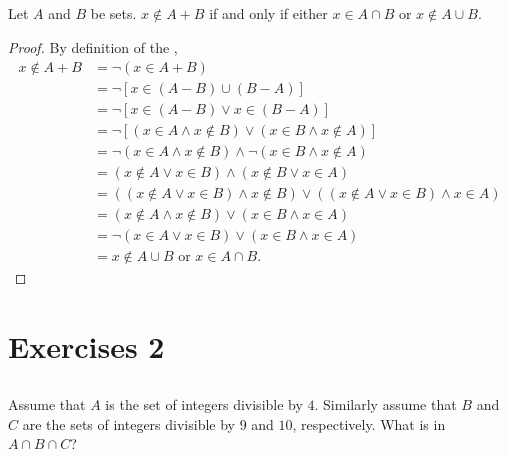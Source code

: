 \documentclass{report}
\begin{document}
\subsection{}
\label{sub:nonmembership-symmetric-difference}

Let $A$ and $B$ be sets. $x \not\in A + B$ if and only if either
  $x \in A \cap B$ or $x \not\in A \cup B$.

\begin{proof}


  By definition of the ,
    \begin{align*}
      x \not\in A + B
        & = \neg(x \in A + B) \\
        & = \neg[x \in (A - B) \cup (B - A)] \\
        & = \neg[x \in (A - B) \lor x \in (B - A)] \\
        & = \neg[(x \in A \land x \not\in B) \lor
          (x \in B \land x \not\in A)] \\
        & = \neg(x \in A \land x \not\in B) \land
          \neg(x \in B \land x \not\in A) \\
        & = (x \not\in A \lor x \in B) \land (x \not\in B \lor x \in A) \\
        & = ((x \not\in A \lor x \in B) \land x \not\in B) \lor
          ((x \not\in A \lor x \in B) \land x \in A) \\
        & = (x \not\in A \land x \not\in B) \lor (x \in B \land x \in A) \\
        & = \neg(x \in A \lor x \in B) \lor (x \in B \land x \in A) \\
        & = x \not\in A \cup B \text{ or } x \in A \cap B.
    \end{align*}

\end{proof}

\section{Exercises 2}%
\label{sec:exercises-2}

\subsection{}%
\label{sub:exercise-2.1}

Assume that $A$ is the set of integers divisible by $4$.
Similarly assume that $B$ and $C$ are the sets of integers divisible by $9$ and
  $10$, respectively.
What is in $A \cap B \cap C$?
\end{document}
